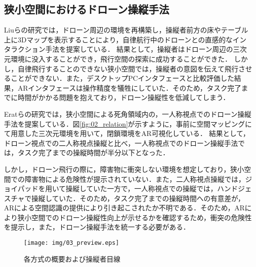 \documentclass[submit]{ipsj}
\begin{document}
\subsection{狭小空間におけるドローン操縦手法}

Liuらの研究\cite{book-ar04}では，ドローン周辺の環境を再構築し，操縦者前方の床やテーブル上に3Dマップを表示することにより，自律航行中のドローンとの直感的なインタラクション手法を提案している．
結果として，操縦者はドローン周辺の三次元環境に没入することができ，飛行空間の探索に成功することができた．
しかし，自律飛行することのできない狭小空間では，操縦者の意図を伝えて飛行させることができない．また，デスクトップPCインタフェースと比較評価した結果，ARインタフェースは操作精度を犠牲にしていた．そのため，タスク完了までに時間がかかる問題を抱えており，ドローン操縦性を低減してしまう．

Eratらの研究\cite{article-ar05}では，狭小空間による死角領域内の，一人称視点でのドローン操縦手法を提案している．図\ref{fig:02_relation}が示すように，事前に空間マッピングにて用意した三次元環境を用いて，閉鎖環境をAR可視化している．
結果として，ドローン視点での二人称視点操縦と比べ，一人称視点でのドローン操縦手法では，タスク完了までの操縦時間が半分以下となった．

しかし，ドローン飛行の際に，障害物に衝突しない環境を想定しており，狭小空間での障害物による危険性が提示されていない．また，二人称視点操縦では，ジョイパッドを用いて操縦していた一方で，一人称視点での操縦では，ハンドジェスチャで操縦していた．そのため，タスク完了までの操縦時間への有意差が，ARによる空間認識の提供により引き起こされたか不明である．そのため，ARにより狭小空間でのドローン操縦性向上が示せるかを確認するため，衝突の危険性を提示し，また，ドローン操縦手法を統一する必要がある．

  
  \begin{figure*}[!tb]
    \centering
    \texttt{[image: img/03\_preview.eps]}
    \caption{各方式の概要および操縦者目線}
    \label{fig:03_preview}
  \end{figure*}



\end{document}
